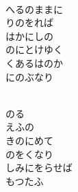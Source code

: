 \documentclass[10pt,b5j]{tarticle} %
\begin{document}
\vspace{1.5em} %
\newcommand{\linespace}{0.5em} %
\newcommand{\blocksize}{0.5\hsize} %
\newcommand{\itemmargin}{3em} %
\begin{enumerate} %
    \setlength{\itemindent}{\itemmargin} %
    \begin{minipage}[c]{\blocksize}
    
        \vspace{\linespace}
        \item~\\
        へるのままに\\
        りのをれば\\
        はかにしの\\
        のにとけゆく\\
        くあるはのか\\
        にのぶなり
        
    \end{minipage}
    \begin{minipage}[c]{\blocksize}
        
        \vspace{\linespace}
        \item~\\
        のる\\
        えふの\\
        きのにめて\\
        のをくなり\\
        しみにをらせば\\
        もつたふ
        
    \end{minipage}
    \begin{minipage}[c]{\blocksize}
        

\end{minipage}
\end{enumerate}
\end{document}
